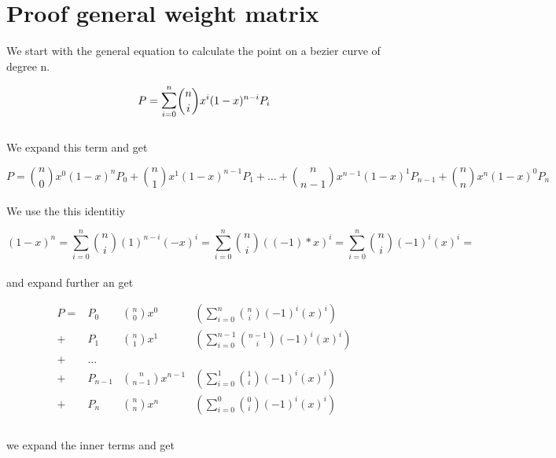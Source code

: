 \section{Proof general weight matrix}
\label{sec:proofgeneralweightmatrix}

We start with the general equation to calculate the point on a bezier curve of degree n.

\begin{equation*}
    P=\mathlarger{\sum}_{i = 0}^{n} {n \choose i}x^i (1-x)^{n-i} P_i
\end{equation*}
\\ We expand this term and get

\begin{equation*}
    P=
    {n \choose 0}x^0 (1-x)^{n} P_0 +
    {n \choose 1}x^1 (1-x)^{n - 1} P_1 +
    \dots +
    {n \choose n-1}x^{n-1} (1-x)^{1} P_{n-1} +
    {n \choose n}x^{n} (1-x)^{0} P_{n}
\end{equation*}
\\
We use the this identitiy

\begin{equation*}
    (1-x)^n =
    \sum_{i = 0}^{n} {n \choose i} (1)^{n-i}(-x)^{i} =
    \sum_{i = 0}^{n} {n \choose i} ((-1)*x)^{i} =
    \sum_{i = 0}^{n} {n \choose i} (-1)^{i}(x)^{i} =
\end{equation*}
\\
and expand further an get

\begin{align*}
    P= & P_0     & {n \choose 0}x^0       & ( \sum_{i = 0}^{n}   {n \choose i}    (-1)^{i}  (x)^{i}) \\
    +  & P_1     & {n \choose 1}x^1       & ( \sum_{i = 0}^{n-1} {n-1 \choose i}  (-1)^{i}  (x)^{i}) \\
    +  & \dots                                                                                       \\
    +  & P_{n-1} & {n \choose n-1}x^{n-1} & ( \sum_{i = 0}^{1}   {1 \choose i}    (-1)^{i}  (x)^{i}) \\
    +  & P_n     & {n \choose n}x^n       & ( \sum_{i = 0}^{0}   {0 \choose i}    (-1)^{i}  (x)^{i}) \\
\end{align*}
\\
we expand the inner terms and get

